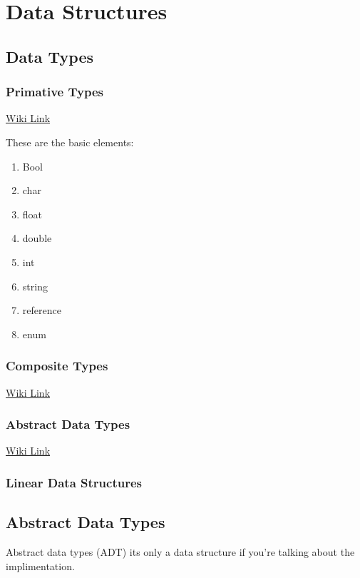 \chapter{Data Structures}
\section{Data Types}
\subsection{Primative Types}

 \href{https://en.wikipedia.org/wiki/Primitive_data_type}{Wiki Link}

These are the basic elements:
	\begin{enumerate}
		\item Bool
		\item char
		\item float
		\item double
		\item int
		\item string
		\item reference
		\item enum
	\end{enumerate}

\subsection{Composite Types}

\href{https://en.wikipedia.org/wiki/Composite_data_type}{Wiki Link}


\subsection{Abstract Data Types}

\href{https://en.wikipedia.org/wiki/Abstract_data_type}{Wiki Link}

\subsection{Linear Data Structures}



\section{Abstract Data Types}
Abstract data types (ADT) \ra its only a data structure if you're talking about the implimentation.

